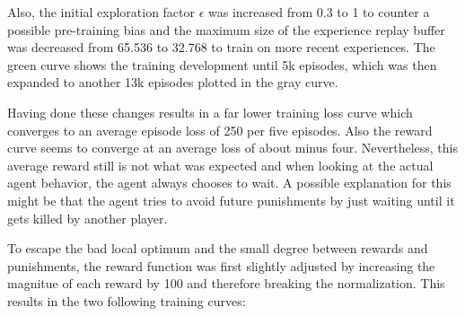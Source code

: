 Also, the initial exploration factor $\epsilon$ was increased from 0.3 to 1 to counter a possible pre-training bias and the maximum size of the experience replay buffer was decreased from 65.536 to 32.768 to train on more recent experiences. The green curve shows the training development until 5k episodes, which was then expanded to another 13k episodes plotted in the gray curve. 

Having done these changes results in a far lower training loss curve which converges to an average episode loss of 250 per five episodes. Also the reward curve seems to converge at an average loss of about minus four. Nevertheless, this average reward still is not what was expected and when looking at the actual agent behavior, the agent always chooses to wait. A possible explanation for this might be that the agent tries to avoid future punishments by just waiting until it gets killed by another player. 

To escape the bad local optimum and the small degree between rewards and punishments, the reward function was first slightly adjusted by increasing the magnitue of each reward by 100 and therefore breaking the normalization. This results in the two following training curves:

